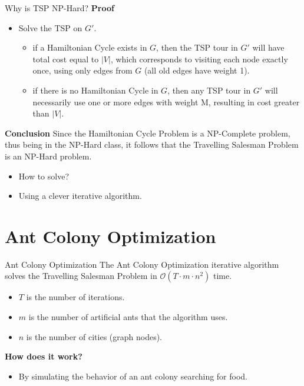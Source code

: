\documentclass[aspectratio=169,xcolor=dvipsnames, t]{beamer}
\begin{document}
\begin{frame}{Why is TSP NP-Hard?}
	\vspace{-5mm}
	\textbf{Proof}
	\begin{itemize}
		\item<2-> Solve the TSP on \( G' \).
			\begin{itemize}
				\item<3-> if a Hamiltonian Cycle exists in \( G \), then the TSP tour in \( G' \) will have total cost equal to \( |V| \), which corresponds to visiting each node exactly once, using only edges from \( G	\) (all old edges have weight 1).
				\item<4-> if there is no Hamiltonian Cycle in \( G \), then any TSP tour in \( G' \) will necessarily use one or more edges with weight M, resulting in cost greater than \( |V| \).
			\end{itemize}
	\end{itemize}

	\textbf{Conclusion}
	Since the Hamiltonian Cycle Problem is a NP-Complete problem, thus being in the NP-Hard class, it follows that the Travelling Salesman Problem is an NP-Hard problem.

	\begin{itemize}
		\item<6-> How to solve?
		\item<7-> Using a clever iterative algorithm.
	\end{itemize}
\end{frame}

\section{Ant Colony Optimization}
\begin{frame}{Ant Colony Optimization}
	\vspace{-5mm}
	\onslide<2->The Ant Colony Optimization iterative algorithm solves the Travelling Salesman Problem in \( \mathcal{O}(T \cdot m \cdot n^2) \) time.

	\begin{itemize}
		\item<3-> \( T \) is the number of iterations.
		\item<4-> \( m \) is the number of artificial ants that the algorithm uses.
		\item<5-> \( n \) is the number of cities (graph nodes).
	\end{itemize}

	\textbf{How does it work?}
	\begin{itemize}
	\item<7-> By simulating the behavior of an ant colony searching for food.
	\end{itemize}
\end{frame}
\end{document}
